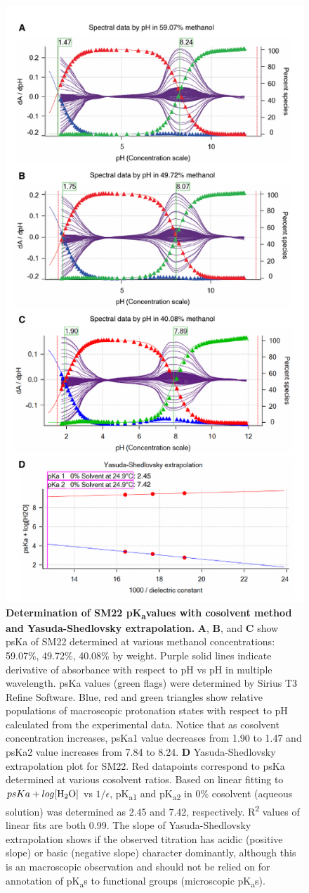 \documentclass[9pt,lineno]{elife}
\newcommand{\pKa}{pK\textsubscript{a}}
\begin{document}
\begin{figure}
\begin{center}
\includegraphics[width=0.5\linewidth]{figures/SM22_cosolvent_extrapolation_fig}
\caption{{\bf Determination of SM22 \pKa values with cosolvent method and Yasuda-Shedlovsky extrapolation.} 
\textbf{A}, \textbf{B}, and \textbf{C} show psKa of SM22 determined at various methanol concentrations: 59.07\%, 49.72\%, 40.08\% by weight.  Purple solid lines indicate derivative of absorbance with respect to pH vs pH in multiple wavelength. psKa values (green flags) were determined by Sirius T3 Refine Software. Blue, red and green triangles show relative populations of macroscopic protonation states with respect to pH calculated from the experimental data. Notice that as cosolvent concentration increases, psKa1 value decreases from 1.90 to 1.47 and psKa2 value increases from 7.84 to 8.24. \textbf{D} Yasuda-Shedlovsky extrapolation plot for SM22. Red datapoints correspond to psKa determined at various cosolvent ratios. Based on linear fitting to $psKa + log [\ce{H2O}]$ vs $1/\epsilon$, \pKa \textsubscript{1} and \pKa \textsubscript{2} in 0\% cosolvent (aqueous solution) was determined as 2.45 and 7.42, respectively. R\textsuperscript{2} values of linear fits are both 0.99. The slope of Yasuda-Shedlovsky extrapolation shows if the observed titration has acidic (positive slope) or basic (negative slope) character dominantly, although this is an macroscopic observation and should not be relied on for annotation of \pKa s to functional groups (microscopic \pKa s).
} 
\label{fig:YS_extrapolation}
\end{center}
\end{figure}
\end{document}
